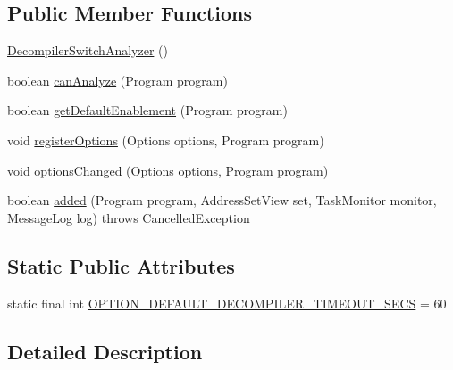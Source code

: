 \subsection*{Public Member Functions}
\begin{DoxyCompactItemize}
\item 
\mbox{\hyperlink{classghidra_1_1app_1_1plugin_1_1core_1_1analysis_1_1_decompiler_switch_analyzer_aeb4a7090b650ab239734e3365b29a3ce}{Decompiler\+Switch\+Analyzer}} ()
\item 
boolean \mbox{\hyperlink{classghidra_1_1app_1_1plugin_1_1core_1_1analysis_1_1_decompiler_switch_analyzer_ad5f8f64513d946008d050f636fef1731}{can\+Analyze}} (Program program)
\item 
boolean \mbox{\hyperlink{classghidra_1_1app_1_1plugin_1_1core_1_1analysis_1_1_decompiler_switch_analyzer_a20dfca6cf34e97fc44741f9f3b273ac9}{get\+Default\+Enablement}} (Program program)
\item 
void \mbox{\hyperlink{classghidra_1_1app_1_1plugin_1_1core_1_1analysis_1_1_decompiler_switch_analyzer_a2722d902aff02b966c5d6d4d1498b8fa}{register\+Options}} (Options options, Program program)
\item 
void \mbox{\hyperlink{classghidra_1_1app_1_1plugin_1_1core_1_1analysis_1_1_decompiler_switch_analyzer_aa42c15468315e121387a1c36a3a52b19}{options\+Changed}} (Options options, Program program)
\item 
boolean \mbox{\hyperlink{classghidra_1_1app_1_1plugin_1_1core_1_1analysis_1_1_decompiler_switch_analyzer_a68c2ae7fcd5574502bb512feaa3ce9dd}{added}} (Program program, Address\+Set\+View set, Task\+Monitor monitor, Message\+Log log)  throws Cancelled\+Exception 
\end{DoxyCompactItemize}
\subsection*{Static Public Attributes}
\begin{DoxyCompactItemize}
\item 
static final int \mbox{\hyperlink{classghidra_1_1app_1_1plugin_1_1core_1_1analysis_1_1_decompiler_switch_analyzer_a4fa167385d2a5c08232af25ce1afde31}{O\+P\+T\+I\+O\+N\+\_\+\+D\+E\+F\+A\+U\+L\+T\+\_\+\+D\+E\+C\+O\+M\+P\+I\+L\+E\+R\+\_\+\+T\+I\+M\+E\+O\+U\+T\+\_\+\+S\+E\+CS}} = 60
\end{DoxyCompactItemize}


\subsection{Detailed Description}


